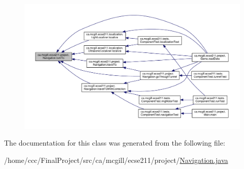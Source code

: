 \begin{figure}[H]
\begin{center}
\leavevmode
\includegraphics[width=350pt]{classca_1_1mcgill_1_1ecse211_1_1project_1_1_navigation_a3bbe0645f2b3b3d0986b4a707fb5a00c_icgraph}
\end{center}
\end{figure}


The documentation for this class was generated from the following file\+:\begin{DoxyCompactItemize}
\item 
/home/ccc/\+Final\+Project/src/ca/mcgill/ecse211/project/\hyperlink{_navigation_8java}{Navigation.\+java}\end{DoxyCompactItemize}
